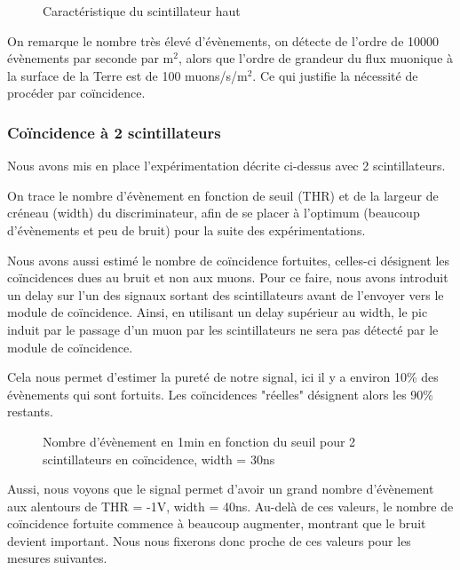 \documentclass[a4paper,12pt,twoside]{article}
\begin{document}
\begin{figure}[ht!]
    \centering
    \caption[Caractéristique du scintillateur haut]{Caractéristique du scintillateur haut}
\end{figure}

On remarque le nombre très élevé d’évènements, on détecte de l’ordre de 10000 évènements par seconde par m$^2$, alors que l’ordre de grandeur du flux muonique à la surface de la Terre est de 100 muons/s/m$^2$. Ce qui justifie la nécessité de procéder par coïncidence.

\subsubsection{Coïncidence à 2 scintillateurs}
Nous avons mis en place l’expérimentation décrite ci-dessus avec 2 scintillateurs.

On trace le nombre d’évènement en fonction de seuil (THR) et de la largeur de créneau (width) du discriminateur, afin de se placer à l’optimum (beaucoup d’évènements et peu de bruit) pour la suite des expérimentations.

Nous avons aussi estimé le nombre de coïncidence fortuites, celles-ci désignent les coïncidences dues au bruit et non aux muons. Pour ce faire, nous avons introduit un delay sur l’un des signaux sortant des scintillateurs avant de l’envoyer vers le module de coïncidence. Ainsi, en utilisant un delay supérieur au width, le pic induit par le passage d’un muon par les scintillateurs ne sera pas détecté par le module de coïncidence.

Cela nous permet d’estimer la pureté de notre signal, ici il y a environ 10\% des évènements qui sont fortuits. Les coïncidences "réelles" désignent alors les 90\% restants.

\begin{figure}[ht!]
    \centering
    \caption[Nombre d’évènement en 1min en fonction du seuil]{Nombre d’évènement en 1min en fonction du seuil pour 2 scintillateurs en coïncidence, width = 30ns}
\end{figure}

Aussi, nous voyons que le signal permet d’avoir un grand nombre d’évènement aux alentours de THR = -1V, width = 40ns. Au-delà de ces valeurs, le nombre de coïncidence fortuite commence à beaucoup augmenter, montrant que le bruit devient important. Nous nous fixerons donc proche de ces valeurs pour les mesures suivantes.
\end{document}
